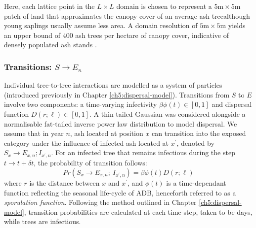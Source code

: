 Here, each lattice point in the $L\times L$ domain is chosen to represent a $5\mathrm{m}\times5\mathrm{m}$ patch of land
that approximates the canopy cover of an average ash tree\textemdash although young saplings usually assume less area. 
A domain resolution of $5\mathrm{m}\times5\mathrm{m}$ yields an upper bound of $400$ ash trees per hectare of canopy cover, 
indicative of densely populated ash stands \cite{ash-tree2, ash-tree1}.

\subsubsection{Transitions: $S\rightarrow E_n$}

Individual tree-to-tree interactions are modelled as a system of particles (introduced previously in Chapter \ref{ch5:dispersal-model}).
Transitions from $S$ to $E$ involve two components: a time-varying infectivity $\beta\phi(t)\in [0, 1]$ and dispersal function $D(r; \ell)\in [0, 1]$.
A thin-tailed Gaussian was considered alongside a normalisable fat-tailed inverse power law distribution to model dispersal.
We assume that in year $n$, ash located at position $x$ can transition into the exposed category under the influence of infected
ash located at $x^\prime$, denoted by $S_x \rightarrow E_{x,n}; I_{x^\prime, n}$.
For an infected tree that remains infectious during the step $t\rightarrow t + \delta t$, the probability of transition follows:
\begin{equation}
    Pr(S_{x} \rightarrow E_{x,n} ;\ I_{x^{\prime}, n} ) = \beta  \phi(t) D(r;\ell)
\end{equation}
where $r$ is the distance between $x$ and $x^{\prime}$, and $\phi(t)$ is a time-dependant function reflecting the seasonal life-cycle of ADB, 
henceforth referred to as a \textit{sporulation function}. Following the method outlined in Chapter \ref{ch5:dispersal-model}, 
transition probabilities are calculated at each time-step, taken to be days, while trees are infectious.

